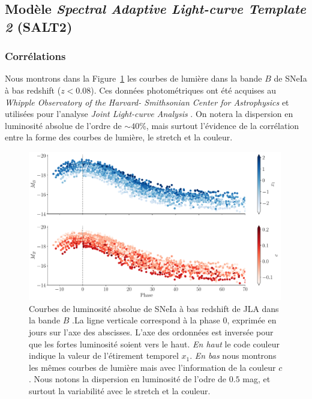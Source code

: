 \documentclass[../main/main.tex]{subfiles}
\begin{document}
\subsection{Modèle \textit{Spectral Adaptive Light-curve Template 2} (SALT2)}\label{ssec:salt2}

\subsubsection{Corrélations}

Nous montrons dans la Figure~\ref{fig:lc_jla} les courbes de lumière
dans la bande $B$ de SNeIa à bas redshift ($z<0.08$). Ces données
photométriques ont été acquises au \textit{Whipple Observatory of the
  Harvard- Smithsonian Center for Astrophysics}
\citep[CfA3,][]{Hicken2009} et utilisées pour l'analyse \textit{Joint Light-curve Analysis}
\citep[JLA,][]{Betoule2014}.  On notera la dispersion en luminosité absolue de
l'ordre de $\sim40\%$, mais surtout l'évidence de la corrélation entre
la forme des courbes de lumière, le stretch et la couleur. 

\begin{figure}[ht]
  \centering
  \includegraphics[width=0.99\textwidth]{../figures/01bis_sne/lc_JLA.pdf}
  \caption[Courbes de lumière de SNeIa à bas redshift de JLA.]{Courbes
    de luminosité absolue de SNeIa à bas redshift de JLA dans la bande $B$ .La ligne verticale correspond à la
    phase $0$, exprimée en jours sur l'axe des abscisses. L'axe des
    ordonnées est inversée pour que les fortes luminosité soient vers le
    haut. \emph{En haut} le code
    couleur indique la valeur de l'étirement temporel $x_{1}$. \emph{En
      bas} nous montrons les mêmes courbes de lumière mais avec
    l'information de la couleur $c$. Nous notons la dispersion en
    luminosité de l'odre de $0.5$ mag, et surtout la variabilité avec le
  stretch et la couleur.}
  \label{fig:lc_jla}
\end{figure}
\end{document}
